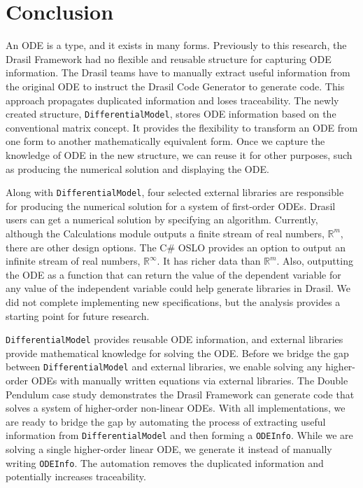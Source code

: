 \chapter{Conclusion}
An ODE is a type, and it exists in many forms. Previously to this research, the Drasil Framework had no flexible and reusable structure for capturing ODE information. The Drasil teams have to manually extract useful information from the original ODE to instruct the Drasil Code Generator to generate code. This approach propagates duplicated information and loses traceability. The newly created structure, \verb|DifferentialModel|, stores ODE information based on the conventional matrix concept. It provides the flexibility to transform an ODE from one form to another mathematically equivalent form. Once we capture the knowledge of ODE in the new structure, we can reuse it for other purposes, such as producing the numerical solution and displaying the ODE.

Along with \verb|DifferentialModel|, four selected external libraries are responsible for producing the numerical solution for a system of first-order ODEs. Drasil users can get a numerical solution by specifying an algorithm. Currently, although the Calculations module outputs a finite stream of real numbers, $\mathbb{R}^m$, there are other design options. The C\# OSLO provides an option to output an infinite stream of real numbers, $\mathbb{R}^{\infty}$. It has richer data than $\mathbb{R}^m$. Also, outputting the ODE as a function that can return the value of the dependent variable for any value of the independent variable could help generate libraries in Drasil. We did not complete implementing new specifications, but the analysis provides a starting point for future research.

\verb|DifferentialModel| provides reusable ODE information, and external libraries provide mathematical knowledge for solving the ODE. Before we bridge the gap between \verb|DifferentialModel| and external libraries, we enable solving any higher-order ODEs with manually written equations via external libraries. The Double Pendulum case study demonstrates the Drasil Framework can generate code that solves a system of higher-order non-linear ODEs. With all implementations, we are ready to bridge the gap by automating the process of extracting useful information from \verb|DifferentialModel| and then forming a \verb|ODEInfo|. While we are solving a single higher-order linear ODE, we generate it instead of manually writing \verb|ODEInfo|. The automation removes the duplicated information and potentially increases traceability.

